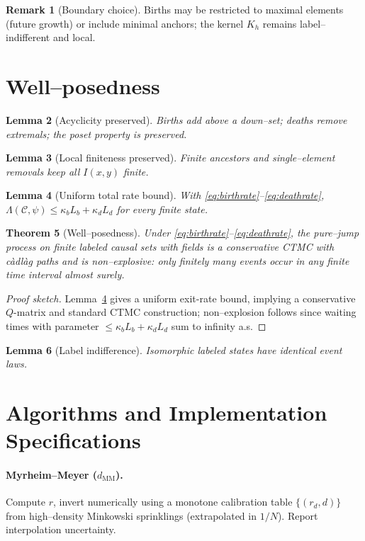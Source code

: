 \documentclass[12pt]{article}
\newtheorem{theorem}{Theorem}[section]
\newtheorem{lemma}[theorem]{Lemma}
\theoremstyle{definition}
\newtheorem{remark}[theorem]{Remark}
\newcommand{\C}{\mathcal{C}}
\newcommand{\Ps}{\psi}
\newcommand{\Ixy}{I(x,y)}
\begin{document}
\begin{remark}[Boundary choice]\label{rem:boundary}
Births may be restricted to maximal elements (future growth) or include minimal anchors; the kernel \(K_h\) remains label--indifferent and local.
\end{remark}

\section{Well--posedness}\label{sec:wellposed}
\begin{lemma}[Acyclicity preserved]\label{lem:acyclic}
Births add above a down--set; deaths remove extremals; the poset property is preserved.
\end{lemma}
\begin{lemma}[Local finiteness preserved]\label{lem:locfin}
Finite ancestors and single--element removals keep all \(\Ixy\) finite.
\end{lemma}
\begin{lemma}[Uniform total rate bound]\label{lem:uniformbound}
With \eqref{eq:birthrate}--\eqref{eq:deathrate}, \(\Lambda(\C,\Ps) \le \kappa_b L_b + \kappa_d L_d\) for every finite state.
\end{lemma}
\begin{theorem}[Well--posedness]\label{thm:wellposed}
Under \eqref{eq:birthrate}--\eqref{eq:deathrate}, the pure--jump process on finite labeled causal sets with fields is a conservative CTMC with càdlàg paths and is non--explosive: only finitely many events occur in any finite time interval almost surely.
\end{theorem}
\begin{proof}[Proof sketch]
Lemma~\ref{lem:uniformbound} gives a uniform exit-rate bound, implying a conservative $Q$-matrix and standard CTMC construction; non--explosion follows since waiting times with parameter $\le \kappa_b L_b+\kappa_d L_d$ sum to infinity a.s.
\end{proof}
\begin{lemma}[Label indifference]\label{lem:label}
Isomorphic labeled states have identical event laws.
\end{lemma}

\section{Algorithms and Implementation Specifications}
\label{sec:algorithms}
\paragraph{Myrheim--Meyer (\(d_{\mathrm{MM}}\)).} Compute \(r\), invert numerically using a monotone calibration table \(\{(r_d,d)\}\) from high--density Minkowski sprinklings (extrapolated in \(1/N\)). Report interpolation uncertainty.
\end{document}
